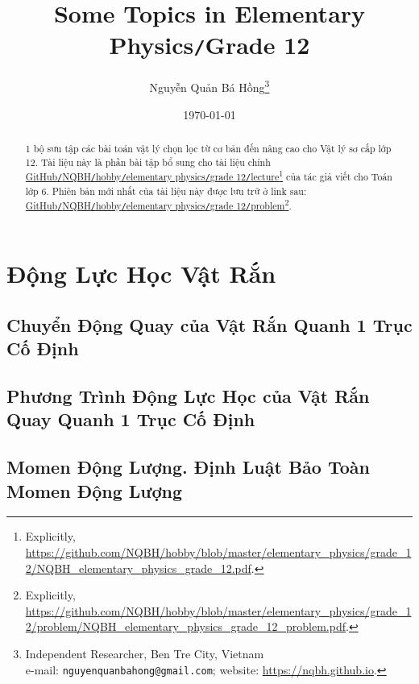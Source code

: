 \documentclass{article}
\title{Some Topics in Elementary Physics\texttt{/}Grade 12}
\author{Nguyễn Quản Bá Hồng\footnote{Independent Researcher, Ben Tre City, Vietnam\\e-mail: \texttt{nguyenquanbahong@gmail.com}; website: \url{https://nqbh.github.io}.}}
\date{\today}
\numberwithin{equation}{section}
\begin{document}
\maketitle
\begin{abstract}
	1 bộ sưu tập các bài toán vật lý chọn lọc từ cơ bản đến nâng cao cho Vật lý sơ cấp lớp 12. Tài liệu này là phần bài tập bổ sung cho tài liệu chính \href{https://github.com/NQBH/hobby/blob/master/elementary_physics/grade_12/NQBH_elementary_physics_grade_12.pdf}{GitHub\texttt{/}NQBH\texttt{/}hobby\texttt{/}elementary physics\texttt{/}grade 12\texttt{/}lecture}\footnote{Explicitly, \url{https://github.com/NQBH/hobby/blob/master/elementary_physics/grade_12/NQBH_elementary_physics_grade_12.pdf}.} của tác giả viết cho Toán lớp 6. Phiên bản mới nhất của tài liệu này được lưu trữ ở link sau: \href{https://github.com/NQBH/hobby/blob/master/elementary_physics/grade_12/problem/NQBH_elementary_physics_grade_12_problem.pdf}{GitHub\texttt{/}NQBH\texttt{/}hobby\texttt{/}elementary physics\texttt{/}grade 12\texttt{/}problem}\footnote{Explicitly, \url{https://github.com/NQBH/hobby/blob/master/elementary_physics/grade_12/problem/NQBH_elementary_physics_grade_12_problem.pdf}.}.
\end{abstract}
\tableofcontents
\newpage



\section{Động Lực Học Vật Rắn}

\subsection{Chuyển Động Quay của Vật Rắn Quanh 1 Trục Cố Định}


\subsection{Phương Trình Động Lực Học của Vật Rắn Quay Quanh 1 Trục Cố Định}


\subsection{Momen Động Lượng. Định Luật Bảo Toàn Momen Động Lượng}
\end{document}
